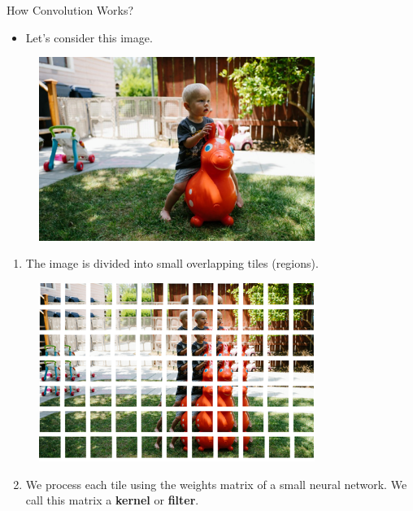 \documentclass[10pt]{beamer}
\theoremstyle{remark}
\theoremstyle{definition}
\begin{document}
\begin{frame}[allowframebreaks]{How Convolution Works?}

\begin{itemize}
    \item Let's consider this image.
\end{itemize}

\begin{figure}\includegraphics[width=0.8\textwidth,height=0.8\textheight,keepaspectratio]{./images/conv_2.png}
\end{figure}

\framebreak

\begin{enumerate}
    \item The image is divided into small overlapping tiles (regions).
\end{enumerate}

\begin{figure}
\centering
\includegraphics[width=0.8\textwidth,height=0.8\textheight,keepaspectratio]{./images/conv_3.png}
\end{figure}

\framebreak

\begin{enumerate}
    \setcounter{enumi}{1}
    \item We process each tile using the weights matrix of a small neural network. We call this matrix a \textbf{kernel} or \textbf{filter}.
\end{enumerate}


\end{frame}
\end{document}
